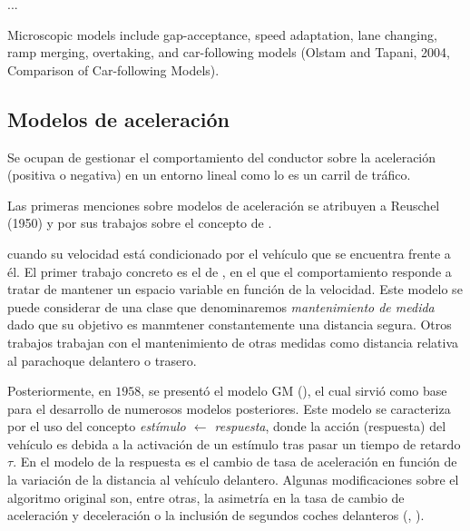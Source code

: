 ...

Microscopic models include gap-acceptance, speed adaptation, lane changing, ramp merging, overtaking,
and car-following models (Olstam and Tapani, 2004, Comparison of Car-following Models).

\subsection{Modelos de aceleración}

Se ocupan de gestionar el comportamiento del conductor sobre la aceleración (positiva o negativa) en un entorno lineal como lo es un carril de tráfico.

Las primeras menciones sobre modelos de aceleración se atribuyen a Reuschel (1950) y \cite{Pipes1953} por sus trabajos sobre el concepto de \textit{}.

 cuando su velocidad está condicionado por el vehículo que se encuentra frente a él. El primer trabajo concreto es el de \cite{Pipes1953}, en el que el comportamiento responde a tratar de mantener un espacio variable en función de la velocidad. Este modelo se puede considerar de una clase que denominaremos \textit{mantenimiento de medida} dado que su objetivo es manmtener constantemente una distancia segura. Otros trabajos trabajan con el mantenimiento de otras medidas como distancia relativa al parachoque delantero o trasero.

Posteriormente, en $1958$, se presentó el modelo GM (\cite{Chandler1958}), el cual sirvió como base para el desarrollo de numerosos modelos posteriores. Este modelo se caracteriza por el uso del concepto \textit{estímulo $\leftarrow$ respuesta}, donde la acción (respuesta) del vehículo es debida a la activación de un estímulo tras pasar un tiempo de retardo  $\tau$. En el modelo de \cite{Chandler1958} la respuesta es el cambio de tasa de aceleración en función de la variación de la distancia al vehículo delantero. Algunas modificaciones sobre el algoritmo original son, entre otras, la asimetría en la tasa de cambio de aceleración y deceleración o la inclusión de segundos coches delanteros (\cite{Gazis1959}, \cite{Bexelius1968}).

